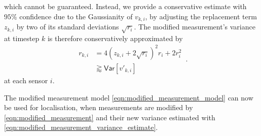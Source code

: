 \documentclass[10pt,letterpaper,oneside,twocolumn,journal]{IEEEtran}
\theoremstyle{definition}
\theoremstyle{definition}
\theoremstyle{remark}
\begin{document}
which cannot be guaranteed. Instead, we provide a conservative estimate with $95\%$ confidence due to the Gaussianity of $v_{k,i}$, by adjusting the replacement term $z_{k,i}$ by two of its standard deviations $\sqrt{r_i}$. The modified measurement's variance at timestep $k$ is therefore conservatively approximated by
\begin{equation}
    \begin{split}
        r_{k, i} &= 4(z_{k,i} + 2\sqrt{r_i})^2r_i + 2r_i^2 \\
        &\gtrapprox \mathsf{Var}[v'_{k,i}]
    \end{split}\,. \label{eqn:modified_measurement_variance_estimate}
\end{equation}
at each sensor $i$.

The modified measurement model \eqref{eqn:modified_measurement_model} can now be used for localisation, when measurements are modified by \eqref{eqn:modified_measurement} and their new variance estimated with \eqref{eqn:modified_measurement_variance_estimate}.

% 
% 
\end{document}
